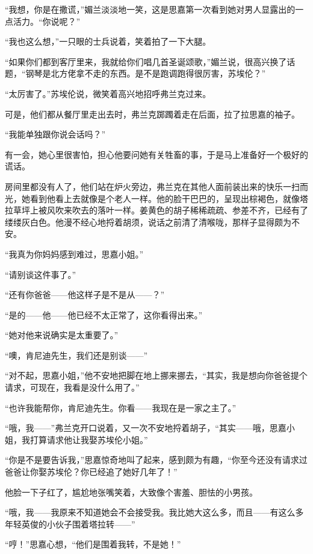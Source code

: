 \par “我想，你是在撒谎，”媚兰淡淡地一笑，这是思嘉第一次看到她对男人显露出的一点活力。“你说呢？”
\par “我也这么想，”一只眼的士兵说着，笑着拍了一下大腿。
\par “如果你们都到客厅里来，我就给你们唱几首圣诞颂歌，”媚兰说，很高兴换了话题，“钢琴是北方佬拿不走的东西。是不是跑调跑得很厉害，苏埃伦？”
\par “太厉害了。”苏埃伦说，微笑着高兴地招呼弗兰克过来。
\par 可是，他们都从餐厅里走出去时，弗兰克踯躅着走在后面，拉了拉思嘉的袖子。
\par “我能单独跟你说会话吗？”
\par 有一会，她心里很害怕，担心他要问她有关牲畜的事，于是马上准备好一个极好的谎话。
\par 房间里都没有人了，他们站在炉火旁边，弗兰克在其他人面前装出来的快乐一扫而光，她看到他看上去就像是个老人一样。他的脸干巴巴的，呈现出棕褐色，就像塔拉草坪上被风吹来吹去的落叶一样。姜黄色的胡子稀稀疏疏、参差不齐，已经有了缕缕灰白色。他漫不经心地捋着胡须，说话之前清了清喉咙，那样子显得颇为不安。
\par “我真为你妈妈感到难过，思嘉小姐。”
\par “请别谈这件事了。”
\par “还有你爸爸——他这样子是不是从——？”
\par “是的——他——他已经不太正常了，这你看得出来。”
\par “她对他来说确实是太重要了。”
\par “噢，肯尼迪先生，我们还是别谈——”
\par “对不起，思嘉小姐，”他不安地把脚在地上挪来挪去，“其实，我是想向你爸爸提个请求，可现在，我看是没什么用了。”
\par “也许我能帮你，肯尼迪先生。你看——我现在是一家之主了。”
\par “哦，我——”弗兰克开口说着，又一次不安地捋着胡子，“其实——哦，思嘉小姐，我打算请求他让我娶苏埃伦小姐。”
\par “你是不是要告诉我，”思嘉惊奇地叫了起来，感到颇为有趣，“你至今还没有请求过爸爸让你娶苏埃伦？你已经追了她好几年了！”
\par 他脸一下子红了，尴尬地张嘴笑着，大致像个害羞、胆怯的小男孩。
\par “哦，我——我原来不知道她会不会接受我。我比她大这么多，而且——有这么多年轻英俊的小伙子围着塔拉转——”
\par “哼！”思嘉心想，“他们是围着我转，不是她！”
